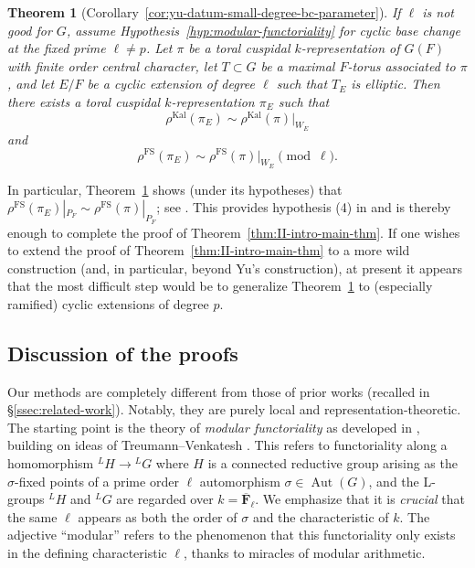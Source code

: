 \documentclass[reqno]{amsart}
\numberwithin{equation}{subsection}
\newcommand{\F}{\mathbf{F}}
\newcommand{\ol}[1]{\overline{#1}}
\newcommand{\ld}{{}^L}
\DeclareMathOperator{\Aut}{Aut}
\DeclareMathOperator{\FS}{FS}
\DeclareMathOperator{\Kal}{Kal}
\newtheorem{thm}{Theorem}[subsection]
\theoremstyle{remark}
\numberwithin{equation}{subsection}
\numberwithin{figure}{subsection}
\begin{document}
\begin{thm}[Corollary~\ref{cor:yu-datum-small-degree-bc-parameter}]\label{thm:II-intro-small-degree-bc}
If $\ell$ is not good for $G$, assume Hypothesis~\ref{hyp:modular-functoriality} for cyclic base change at the fixed prime $\ell \neq p$.
Let $\pi$ be a toral cuspidal $k$-representation of $G(F)$ with finite order central character, let $T \subset G$ be a maximal $F$-torus associated to $\pi$, and let $E/F$ be a cyclic extension of degree $\ell$ such that $T_E$ is elliptic. Then there exists a toral cuspidal $k$-representation $\pi_E$ such that
\[
\rho^{\Kal}(\pi_E) \sim \rho^{\Kal}(\pi)|_{W_E}
\]
and
\[
\rho^{\FS}(\pi_E) \sim \rho^{\FS}(\pi)|_{W_E} \pmod{\ell}.
\]
\end{thm}

In particular, Theorem~\ref{thm:II-intro-small-degree-bc} shows (under its hypotheses) that $\rho^{\FS}(\pi_E)|_{P_F} \sim \rho^{\FS}(\pi)|_{P_F}$; see \cite[Lemma~5.3.2]{Cot26b}. This provides hypothesis (4) in \cite[Theorem~1.3.1]{CF26a} and is thereby enough to complete the proof of Theorem~\ref{thm:II-intro-main-thm}. If one wishes to extend the proof of Theorem~\ref{thm:II-intro-main-thm} to a more wild construction (and, in particular, beyond Yu's construction), at present it appears that the most difficult step would be to generalize Theorem~\ref{thm:II-intro-small-degree-bc} to (especially ramified) cyclic extensions of degree $p$.


\subsection{Discussion of the proofs}\label{ssec:III-intro-proofs}



Our methods are completely different from those of prior works (recalled in \S \ref{ssec:related-work}). Notably, they are purely local and representation-theoretic. The starting point is the theory of \emph{modular functoriality} as developed in \cite{F24}, building on ideas of Treumann--Venkatesh \cite{TV}. This refers to functoriality along a homomorphism $\ld H \rightarrow \ld G$ where $H$ is a connected reductive group arising as the $\sigma$-fixed points of a prime order $\ell$ automorphism $\sigma \in \Aut(G)$, and the L-groups $\ld H$ and $\ld G$ are regarded over $k = \ol \F_\ell$. We emphasize that it is \emph{crucial} that the same $\ell$ appears as both the order of $\sigma$ and the characteristic of $k$. The adjective ``modular'' refers to the phenomenon that this functoriality only exists in the defining characteristic $\ell$, thanks to miracles of modular arithmetic. 
\end{document}
